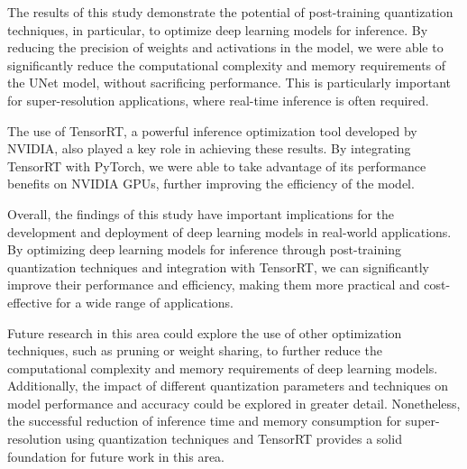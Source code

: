 \label{chap:conclusion}

The results of this study demonstrate the potential of post-training quantization techniques, in particular, to optimize deep learning models for inference. By reducing the precision of weights and activations in the model, we were able to significantly reduce the computational complexity and memory requirements of the UNet model, without sacrificing performance. This is particularly important for super-resolution applications, where real-time inference is often required.

The use of TensorRT, a powerful inference optimization tool developed by NVIDIA, also played a key role in achieving these results. By integrating TensorRT with PyTorch, we were able to take advantage of its performance benefits on NVIDIA GPUs, further improving the efficiency of the model.

Overall, the findings of this study have important implications for the development and deployment of deep learning models in real-world applications. By optimizing deep learning models for inference through post-training quantization techniques and integration with TensorRT, we can significantly improve their performance and efficiency, making them more practical and cost-effective for a wide range of applications.

Future research in this area could explore the use of other optimization techniques, such as pruning or weight sharing, to further reduce the computational complexity and memory requirements of deep learning models. Additionally, the impact of different quantization parameters and techniques on model performance and accuracy could be explored in greater detail. Nonetheless, the successful reduction of inference time and memory consumption for super-resolution using quantization techniques and TensorRT provides a solid foundation for future work in this area.

